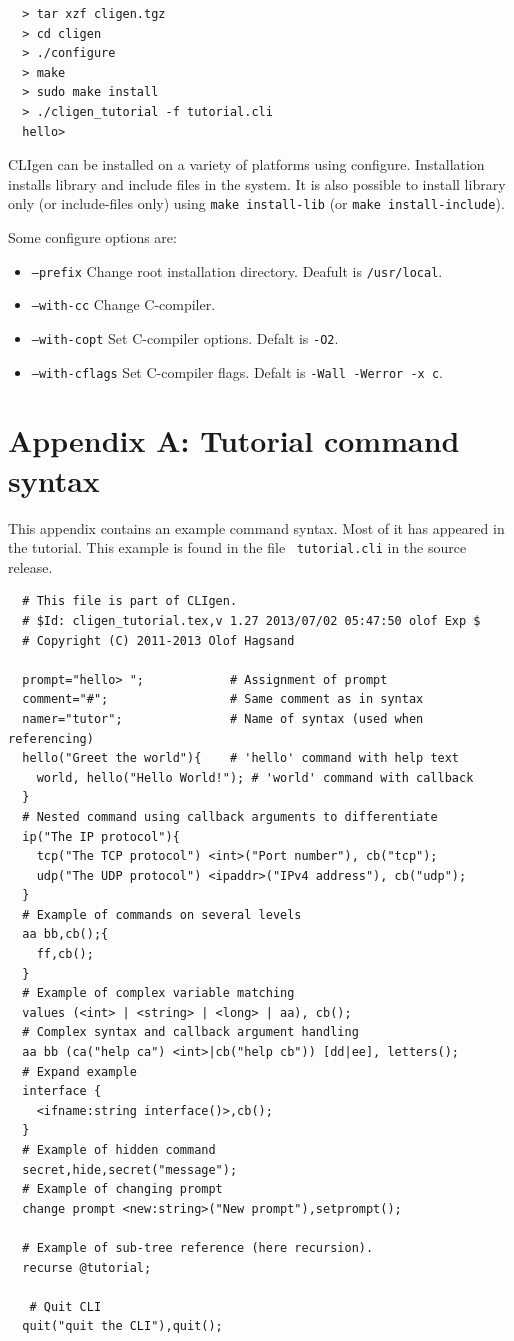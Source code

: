 \documentclass[a4paper, 10pt] {article}
\begin{document}
\begin{verbatim}
  > tar xzf cligen.tgz
  > cd cligen
  > ./configure
  > make
  > sudo make install
  > ./cligen_tutorial -f tutorial.cli
  hello>
\end{verbatim}

CLIgen can be installed on a variety of platforms using
configure. Installation installs library and include files in the
system. It is also possible to install library only (or include-files
only) using {\tt make install-lib} (or {\tt make install-include}).

\normalsize
Some configure options are:
\begin{itemize}
\item {\tt --prefix} Change root installation directory. Deafult is {\tt /usr/local}.
\item {\tt --with-cc} Change C-compiler. 
\item {\tt --with-copt} Set C-compiler options. Defalt is {\tt -O2}.
\item {\tt --with-cflags} Set C-compiler flags. Defalt is {\tt -Wall -Werror -x c}.
\end{itemize}


\newpage
\section*{Appendix A: Tutorial command syntax}
\label{app:syntax}

This appendix contains an example command syntax. Most of it has
appeared in the tutorial. This example is found in the file {\tt
  tutorial.cli} in the source release.

\small
\begin{verbatim}
  # This file is part of CLIgen.
  # $Id: cligen_tutorial.tex,v 1.27 2013/07/02 05:47:50 olof Exp $
  # Copyright (C) 2011-2013 Olof Hagsand

  prompt="hello> ";            # Assignment of prompt
  comment="#";                 # Same comment as in syntax
  namer="tutor";               # Name of syntax (used when referencing)
  hello("Greet the world"){    # 'hello' command with help text
    world, hello("Hello World!"); # 'world' command with callback
  }
  # Nested command using callback arguments to differentiate
  ip("The IP protocol"){       
    tcp("The TCP protocol") <int>("Port number"), cb("tcp");
    udp("The UDP protocol") <ipaddr>("IPv4 address"), cb("udp");
  }
  # Example of commands on several levels
  aa bb,cb();{              
    ff,cb();
  }
  # Example of complex variable matching
  values (<int> | <string> | <long> | aa), cb();
  # Complex syntax and callback argument handling
  aa bb (ca("help ca") <int>|cb("help cb")) [dd|ee], letters();
  # Expand example
  interface {
    <ifname:string interface()>,cb(); 
  }
  # Example of hidden command
  secret,hide,secret("message");        
  # Example of changing prompt
  change prompt <new:string>("New prompt"),setprompt(); 
  
  # Example of sub-tree reference (here recursion).
  recurse @tutorial;

   # Quit CLI
  quit("quit the CLI"),quit(); 
\end{verbatim}
\normalsize
\end{document}
